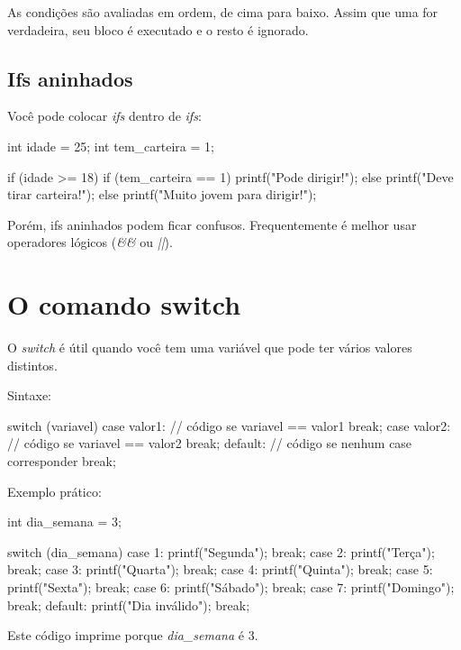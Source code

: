 As condições são avaliadas em ordem, de cima para baixo. Assim que uma for verdadeira, seu bloco é executado e o resto é ignorado.

\subsection{Ifs aninhados}

Você pode colocar \textit{ifs} dentro de \textit{ifs}:

\begin{ccode}
  int idade = 25;
  int tem_carteira = 1;

  if (idade >= 18) {
    if (tem_carteira == 1) {
      printf("Pode dirigir!\n");
    } else {
      printf("Deve tirar carteira!\n");
    }
  } else {
    printf("Muito jovem para dirigir!\n");
  }
\end{ccode}

Porém, ifs aninhados podem ficar confusos. Frequentemente é melhor usar operadores lógicos (\textit{\&\&} ou \textit{||}).

\section{O comando switch}

O \textit{switch} é útil quando você tem uma variável que pode ter vários valores distintos.

Sintaxe:

\begin{ccode}
  switch (variavel) {
    case valor1:
      // código se variavel == valor1
      break;
    case valor2:
      // código se variavel == valor2
      break;
    default:
      // código se nenhum case corresponder
      break;
  }
\end{ccode}

Exemplo prático:

\begin{ccode}
  int dia_semana = 3;

  switch (dia_semana) {
    case 1:
      printf("Segunda\n");
      break;
    case 2:
      printf("Terça\n");
      break;
    case 3:
      printf("Quarta\n");
      break;
    case 4:
      printf("Quinta\n");
      break;
    case 5:
      printf("Sexta\n");
      break;
    case 6:
      printf("Sábado\n");
      break;
    case 7:
      printf("Domingo\n");
      break;
    default:
      printf("Dia inválido\n");
      break;
  }
\end{ccode}

Este código imprime  porque \textit{dia\_semana} é 3.

